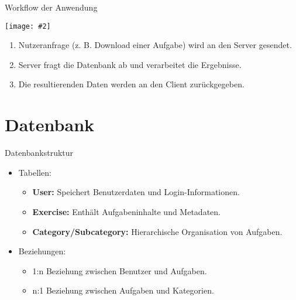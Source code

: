 \documentclass{beamer}
\newcommand{\centfig}[2]{\begin{center}
  \texttt{[image: \#2]}
  \end{center}}
\begin{document}
\begin{frame}{Workflow der Anwendung}
    \centfig{0.3}{web-app-workflow.png}
    \begin{enumerate}
        \item<1-> Nutzeranfrage (z. B. Download einer Aufgabe) wird an den Server gesendet.
        \item<2-> Server fragt die Datenbank ab und verarbeitet die Ergebnisse.
        \item<3-> Die resultierenden Daten werden an den Client zurückgegeben.
    \end{enumerate}
\end{frame}

\section{Datenbank}
\begin{frame}{Datenbankstruktur}
    \begin{itemize}
        \item<1-> Tabellen:
        \begin{itemize}
            \item \textbf{User:} Speichert Benutzerdaten und Login-Informationen.
            \item \textbf{Exercise:} Enthält Aufgabeninhalte und Metadaten.
            \item \textbf{Category/Subcategory:} Hierarchische Organisation von Aufgaben.
        \end{itemize}
        \item<2-> Beziehungen:
        \begin{itemize}
            \item 1:n Beziehung zwischen Benutzer und Aufgaben.
            \item n:1 Beziehung zwischen Aufgaben und Kategorien.
        \end{itemize}
    \end{itemize}
\end{frame}

\end{document}
